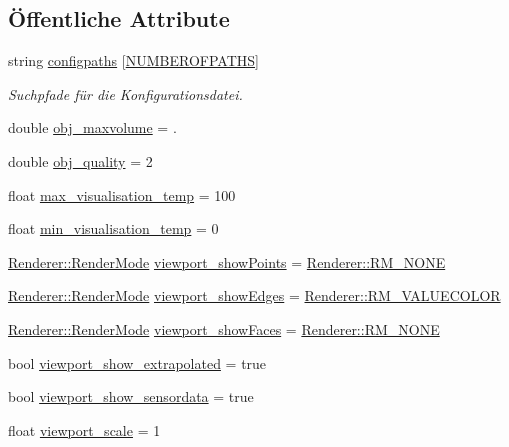 \subsection*{Öffentliche Attribute}
\begin{DoxyCompactItemize}
\item 
string \hyperlink{classDefaultValues_a0c95426ed23ffb6f41da68842984f3d3}{configpaths} \mbox{[}\hyperlink{classDefaultValues_a22795666a3d9f21c2767babec8a49a7a}{N\-U\-M\-B\-E\-R\-O\-F\-P\-A\-T\-H\-S}\mbox{]}
\begin{DoxyCompactList}\small\item\em Suchpfade für die Konfigurationsdatei. \end{DoxyCompactList}\item 
double \hyperlink{classDefaultValues_af9b712688c52236728bb5bd6714b6b8c}{obj\-\_\-maxvolume} = .
\item 
double \hyperlink{classDefaultValues_aa7a66c2f7ed71d8b70e17a249b178b77}{obj\-\_\-quality} = 2
\item 
float \hyperlink{classDefaultValues_a9bb20fa7d05044c972db7d296f1091b8}{max\-\_\-visualisation\-\_\-temp} = 100
\item 
float \hyperlink{classDefaultValues_af370e72384712db1cd6eb225327d8c8d}{min\-\_\-visualisation\-\_\-temp} = 0
\item 
\hyperlink{classRenderer_aa9844470f59e9fdf3aed088936100863}{Renderer\-::\-Render\-Mode} \hyperlink{classDefaultValues_a2b2b60d342d0d946036ccddeae5b8a7b}{viewport\-\_\-show\-Points} = \hyperlink{classRenderer_aa9844470f59e9fdf3aed088936100863a117f4ca0fdddef6e71774540e331efe9}{Renderer\-::\-R\-M\-\_\-\-N\-O\-N\-E}
\item 
\hyperlink{classRenderer_aa9844470f59e9fdf3aed088936100863}{Renderer\-::\-Render\-Mode} \hyperlink{classDefaultValues_abaee1f32df0f3c30194c970c094d841e}{viewport\-\_\-show\-Edges} = \hyperlink{classRenderer_aa9844470f59e9fdf3aed088936100863aff17440f3de9508b77d4762742c00c07}{Renderer\-::\-R\-M\-\_\-\-V\-A\-L\-U\-E\-C\-O\-L\-O\-R}
\item 
\hyperlink{classRenderer_aa9844470f59e9fdf3aed088936100863}{Renderer\-::\-Render\-Mode} \hyperlink{classDefaultValues_a10cb0c8b03531c729ee1f5a9cfe255ca}{viewport\-\_\-show\-Faces} = \hyperlink{classRenderer_aa9844470f59e9fdf3aed088936100863a117f4ca0fdddef6e71774540e331efe9}{Renderer\-::\-R\-M\-\_\-\-N\-O\-N\-E}
\item 
bool \hyperlink{classDefaultValues_a6276bda75c6e96c1fb857502e5d21e85}{viewport\-\_\-show\-\_\-extrapolated} = true
\item 
bool \hyperlink{classDefaultValues_a456bf1afc20078111b87b57576de068c}{viewport\-\_\-show\-\_\-sensordata} = true
\item 
float \hyperlink{classDefaultValues_a8b35f6b9a00500405819eb07f986ef97}{viewport\-\_\-scale} = 1
\end{DoxyCompactItemize}
